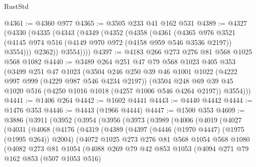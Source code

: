 \begin{lexlean}{RustStd}
\begin{coremodule}
@4361 := @4360 @977
@4365 := @3505 @233 @41 @162 @531
@4389 := @4327
    (@4330
      (@4335
        (@4343
          (@4349
            (@4352
              (@4358
                (@4361
                  (@4365
                    @976
                    @3521
                    (@4145 @974 @516 (@4149 @970 @972 (@4158 @959 @546 @3536 @2197)) @3554)))
                @2362))
            @3554))))
@4397 := @4183 @266 @273 @276 @81 @568 @1025 @568 @1082
@4440 := @3489
    @264
    @251
    @47
    @79
    @568
    @1023
    @405
    @353
    (@3499
      @251
      @47
      @1023
      (@3504
        @246
        @250
        @39
        @46
        @1001
        @1022
        (@4222 @997 @999 (@4229 @987 @546 @4234 @2197))
        (@3504
          @248
          @69
          @39
          @45
          @1020
          @516
          (@4250 @1016 @1018 (@4257 @1006 @546 @4264 @2197))
          @3554)))
@4441 := @1406 @264
@4442 := @1602 @4441
@4443 := @4440 @4442
@4444 := @1476 @353
@4446 := @4443 (@1966 @4444)
@4447 := @1500 @353
@4609 := @3886
    (@3911
      (@3952
        (@3954
          (@3956
            (@3973
              (@3989
                (@4006
                  (@4019
                    (@4027
                      (@4031
                        (@4068
                          (@4176
                            (@4319
                              (@4389
                                (@4397
                                  (@4446 (@1970 @4447) (@1975 (@1995 @264)) @2004)
                                  (@4072
                                    @1025
                                    @273
                                    @276
                                    @81
                                    @568
                                    @1054
                                    @568
                                    @1080
                                    (@4082
                                      @273
                                      @81
                                      @1054
                                      (@4088
                                        @269
                                        @79
                                        @42
                                        @853
                                        @1053
                                        (@4094
                                          @271
                                          @79
                                          @162
                                          @853
                                          (@507 @1053 @516)

\end{coremodule}
\end{lexlean}
